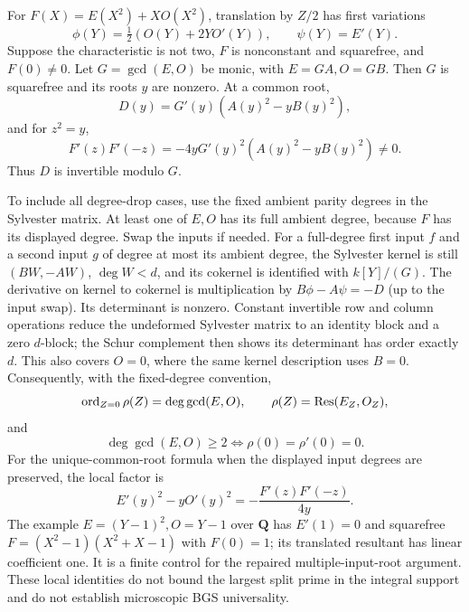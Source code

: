 For $F(X)=E(X^2)+XO(X^2)$, translation by $Z/2$ has first variations
\[
\phi(Y)=\tfrac12(O(Y)+2YO'(Y)),\qquad\psi(Y)=E'(Y).
\]
Suppose the characteristic is not two, $F$ is nonconstant and squarefree,
and $F(0)\ne0$. Let $G=\gcd(E,O)$ be monic, with $E=GA,O=GB$.
Then $G$ is squarefree and its roots $y$ are nonzero. At a common root,
\[
D(y)=G'(y)(A(y)^2-yB(y)^2),
\]
and for $z^2=y$,
\[
F'(z)F'(-z)=-4yG'(y)^2(A(y)^2-yB(y)^2)\ne0.
\]
Thus $D$ is invertible modulo $G$.

To include all degree-drop cases, use the fixed ambient parity degrees in the
Sylvester matrix. At least one of $E,O$ has its full ambient degree, because
$F$ has its displayed degree. Swap the inputs if needed. For a full-degree
first input $f$ and a second input $g$ of degree at most its ambient degree,
the Sylvester kernel is still $(BW,-AW)$, $\deg W<d$, and its cokernel is
identified with $k[Y]/(G)$. The derivative on kernel to cokernel is
multiplication by $B\phi-A\psi=-D$ (up to the input swap).
Its determinant is nonzero. Constant invertible row and column operations
reduce the undeformed Sylvester matrix to an identity block and a zero
$d$-block; the Schur complement then shows its determinant has order exactly
$d$. This also covers $O=0$, where the same kernel description uses $B=0$.
Consequently, with the fixed-degree convention,
\[
\operatorname{ord}_{Z=0}\rho(Z)=\deg\gcd(E,O),\qquad \rho(Z)=\operatorname{Res}(E_Z,O_Z),
\]
and
\[
\deg\gcd(E,O)\ge2\iff\rho(0)=\rho'(0)=0.
\]
For the unique-common-root formula when the displayed input degrees are
preserved, the local factor is
\[
E'(y)^2-yO'(y)^2=-\frac{F'(z)F'(-z)}{4y}.
\]
The example $E=(Y-1)^2,O=Y-1$ over $\mathbf Q$ has $E'(1)=0$ and squarefree
$F=(X^2-1)(X^2+X-1)$ with $F(0)=1$; its translated resultant has linear
coefficient one. It is a finite control for the repaired multiple-input-root
argument. These local identities do not bound the largest split prime in the
integral support and do not establish microscopic BGS universality.

